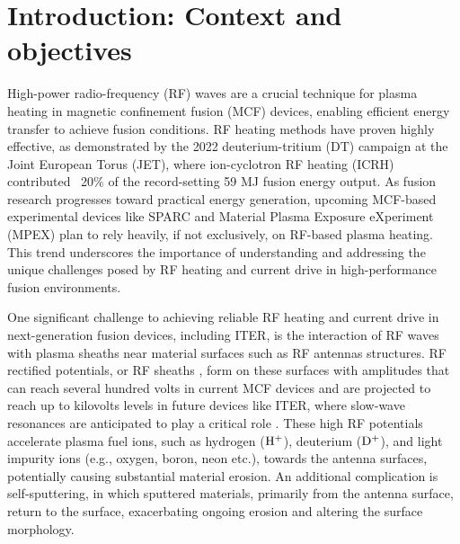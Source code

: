 \documentclass[10pt]{iopart}
\begin{document}
\section{Introduction: Context and objectives}
\label{sec:1}

%

High-power radio-frequency (RF) waves are a crucial technique for plasma heating in magnetic confinement fusion (MCF) devices, enabling efficient energy transfer to achieve fusion conditions. RF heating methods have proven highly effective, as demonstrated by the 2022 deuterium-tritium (DT) campaign at the Joint European Torus (JET), where ion-cyclotron RF heating (ICRH) contributed ~20\% of the record-setting 59 MJ fusion energy output\cite{Maslov_2023}.  As fusion research progresses toward practical energy generation, upcoming MCF-based experimental devices like SPARC \cite{Creely_2020, Rodriguez-Fernandez_2022} and  Material Plasma Exposure eXperiment (MPEX) \cite{Rapp_2020, Kumar_2023} plan to rely heavily, if not exclusively, on RF-based plasma heating. This trend underscores the importance of understanding and addressing the unique challenges posed by RF heating and current drive in high-performance fusion environments.

One significant challenge to achieving reliable RF heating and current drive in next-generation fusion devices, including ITER, is the interaction of RF waves with plasma sheaths near material surfaces such as RF antennas structures. RF rectified potentials, or RF sheaths \cite{myra2021tutorial}, form on these surfaces with amplitudes that can reach several hundred volts in current MCF devices \cite{Tierens_2024} and are projected to reach up to kilovolts levels in future devices like ITER, where slow-wave resonances are anticipated to play a critical role \cite{tierens2023resonance}. These high RF potentials accelerate plasma fuel ions, such as hydrogen ($\rm H^+$), deuterium ($\rm D^+$), and light impurity ions (e.g., oxygen, boron, neon etc.), towards the antenna surfaces, potentially causing substantial material erosion. An additional complication is self-sputtering, in which sputtered materials, primarily from the antenna surface, return to the surface, exacerbating ongoing erosion and altering the surface morphology.
\end{document}
